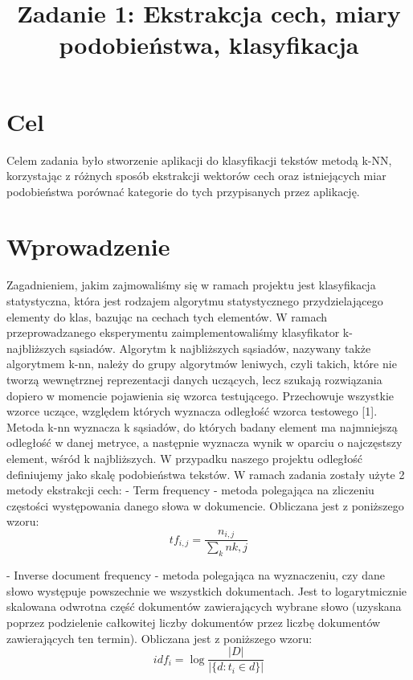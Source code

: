 \documentclass{classrep}
\author{
	\studentinfo{Justyna Hubert}{210200} \and
	\studentinfo{Karol Podlewski}{210294}
}
\title{Zadanie 1: Ekstrakcja cech, miary podobieństwa, klasyfikacja}
\begin{document}
	\maketitle
	
	
	\section{Cel}
	Celem zadania było stworzenie aplikacji do klasyfikacji tekstów metodą k-NN, korzystając z różnych sposób ekstrakcji wektorów cech oraz istniejących miar podobieństwa porównać kategorie do tych przypisanych przez aplikację.
	
	\section{Wprowadzenie}	
	
		Zagadnieniem, jakim zajmowaliśmy się w ramach projektu jest klasyfikacja statystyczna, która jest rodzajem algorytmu statystycznego przydzielającego elementy do klas, bazując na cechach tych elementów. W ramach przeprowadzanego eksperymentu zaimplementowaliśmy klasyfikator k-najbliższych sąsiadów. \newline
		Algorytm k najbliższych sąsiadów, nazywany także algorytmem k-nn, należy do grupy algorytmów leniwych, czyli takich, które nie tworzą wewnętrznej reprezentacji danych uczących, lecz szukają rozwiązania dopiero w momencie pojawienia się wzorca testującego. Przechowuje wszystkie wzorce uczące, względem których wyznacza odległość wzorca testowego [1]. Metoda k-nn wyznacza k sąsiadów, do których badany element ma najmniejszą odległość w danej metryce, a następnie wyznacza wynik w oparciu o najczęstszy element, wśród k najbliższych. W przypadku naszego projektu odległość definiujemy jako skalę podobieństwa tekstów. \newline
		W ramach zadania zostały użyte 2 metody ekstrakcji cech: \newline
			- Term frequency - metoda polegająca na zliczeniu częstości występowania danego słowa w dokumencie. Obliczana jest z poniższego wzoru:
			$$
			tf_{i,j}
			= \frac{n_{i,j}}{\sum_{k}n{k,j}}
			$$
			
			- Inverse document frequency - metoda polegająca na wyznaczeniu, czy dane słowo występuje powszechnie we wszystkich dokumentach. Jest to logarytmicznie skalowana odwrotna część dokumentów zawierających wybrane słowo (uzyskana poprzez podzielenie całkowitej liczby dokumentów przez liczbę dokumentów zawierających ten termin). Obliczana jest z poniższego wzoru: \newline
			$$
			idf_{i}
			= \log\frac{|D|}{|\{d : t_{i} \in d\}|}
			$$
		
\end{document}
